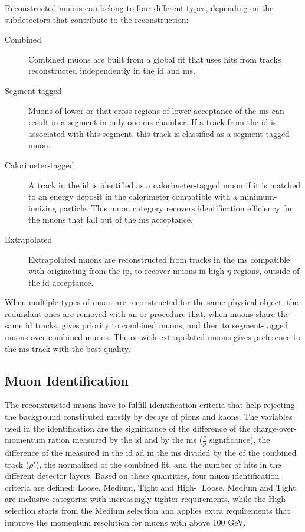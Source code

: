 Reconstructed muons can belong to four different types, depending on the subdetectors that contribute to the reconstruction:

\begin{description}
\item [Combined] Combined muons are built from a global fit that uses hits from tracks reconstructed independently in the \gls{id} and \gls{ms}.
\item[Segment-tagged] Muons of lower \pt or that cross regions of lower acceptance of the \gls{ms} can result in a segment in only one \gls{ms} chamber. If a track from the \gls{id} is associated with this segment, this track is classified as a segment-tagged muon.
\item[Calorimeter-tagged] A track in the \gls{id} is identified as a calorimeter-tagged muon if it is matched to an energy deposit in the calorimeter compatible with a minimum-ionizing particle. This muon category recovers identification efficiency for the muons that fall out of the \gls{ms} acceptance.
\item[Extrapolated] Extrapolated muons are reconstructed from tracks in the \gls{ms} compatible with originating from the \gls{ip}, to recover muons in high-$\eta$ regions, outside of the \gls{id} acceptance.
\end{description}

When multiple types of muon are reconstructed for the same physical object, the redundant ones are removed with an \gls{or} procedure that, when muons share the same \gls{id} tracks, gives priority to combined muons, and then to segment-tagged muons over combined muons. The \gls{or} with extrapolated muons gives preference to the \gls{ms} track with the best quality.

\subsection{Muon Identification}

The reconstructed muons have to fulfill identification criteria that help rejecting the background constituted mostly by decays of pions and kaons. 
The variables used in the identification are the significance of the difference of the charge-over-momentum ration measured by the \gls{id} and by the \gls{ms} ($\frac{q}{p}$ significance),
the difference of the \pt measured in the \gls{id} ad in the \gls{ms} divided by the \pt of the combined track ($\rho'$),
the normalized \chis of the combined fit,
and the number of hits in the different detector layers. 
Based on these quantities, four muon identification criteria are defined: Loose, Medium, Tight and High-\pt. 
Loose, Medium and Tight are inclusive categories with increasingly tighter requirements, while the High-\pt selection starts from the Medium selection and applies extra requirements that improve the momentum resolution for muons with \pt above 100 GeV.

